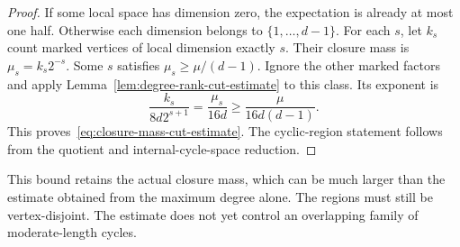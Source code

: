 \begin{proof}
If some local space has dimension zero, the expectation is already at most one half.
Otherwise each dimension belongs to $\{1,\ldots,d-1\}$.
For each $s$, let $k_s$ count marked vertices of local dimension exactly $s$.
Their closure mass is $\mu_s=k_s2^{-s}$.
Some $s$ satisfies $\mu_s\ge\mu/(d-1)$.
Ignore the other marked factors and apply Lemma~\ref{lem:degree-rank-cut-estimate} to this class.
Its exponent is
\[
 \frac{k_s}{8d2^{s+1}}=\frac{\mu_s}{16d}
 \ge\frac{\mu}{16d(d-1)}.
\]
This proves~\eqref{eq:closure-mass-cut-estimate}.
The cyclic-region statement follows from the quotient and internal-cycle-space reduction.
\end{proof}

This bound retains the actual closure mass, which can be much larger than the estimate obtained from the maximum degree alone.
The regions must still be vertex-disjoint.
The estimate does not yet control an overlapping family of moderate-length cycles.
